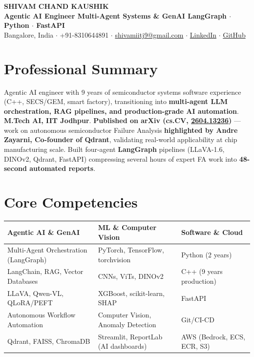 \documentclass[11pt,a4paper]{article}
\begin{document}
\begin{center}
    {\LARGE\bfseries SHIVAM CHAND KAUSHIK}\\[4pt]
    {\large\color{accent}\textbf{Agentic AI Engineer \textbar{} Multi-Agent Systems \& GenAI \textbar{} LangGraph $\cdot$ Python $\cdot$ FastAPI}}\\[6pt]
    Bangalore, India \enspace$\cdot$\enspace
    +91-8310644891 \enspace$\cdot$\enspace
    \href{mailto:shivamiitj9@gmail.com}{shivamiitj9@gmail.com} \enspace$\cdot$\enspace
    \href{https://www.linkedin.com/in/shivam-chand-kaushik-34a723a8}{LinkedIn} \enspace$\cdot$\enspace
    \href{https://github.com/Shivamckaushik/}{GitHub}
\end{center}

\section{Professional Summary}

Agentic AI engineer with 9 years of semiconductor systems software experience (C++, SECS/GEM, smart factory), transitioning into \textbf{multi-agent LLM orchestration, RAG pipelines, and production-grade AI automation}. \textbf{M.Tech AI, IIT Jodhpur}. \textbf{Published on arXiv (cs.CV, \href{https://arxiv.org/abs/2604.13236}{2604.13236})} --- work on autonomous semiconductor Failure Analysis \textbf{highlighted by \textcolor{accent}{Andre Zayarni, Co-founder of Qdrant}}, validating real-world applicability at chip manufacturing scale. Built four-agent \textbf{LangGraph} pipelines (LLaVA-1.6, DINOv2, Qdrant, FastAPI) compressing several hours of expert FA work into \textbf{48-second automated reports}.
\section{Core Competencies}

\begin{tabularx}{\textwidth}{|X|X|X|}
\hline
\textbf{Agentic AI \& GenAI} & \textbf{ML \& Computer Vision} & \textbf{Software \& Cloud} \\
\hline
Multi-Agent Orchestration (LangGraph) & PyTorch, TensorFlow, torchvision & Python (2 years) \\
LangChain, RAG, Vector Databases & CNNs, ViTs, DINOv2 & C++ (9 years production) \\
LLaVA, Qwen-VL, QLoRA/PEFT & XGBoost, scikit-learn, SHAP & FastAPI \\
Autonomous Workflow Automation & Computer Vision, Anomaly Detection & Git/CI-CD \\
Qdrant, FAISS, ChromaDB & Streamlit, ReportLab (AI dashboards) & AWS (Bedrock, ECS, ECR, S3) \\
\hline
\end{tabularx}
\end{document}
